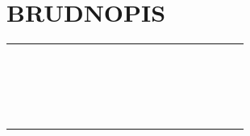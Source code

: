 \documentclass[10pt]{article}
\begin{document}
\section*{BRUDNOPIS}
\begin{center}
\begin{tabular}{|c|c|c|c|c|c|c|c|c|c|c|c|c|c|c|c|c|c|c|c|c|}
\hline
 &  &  &  &  &  &  &  &  &  &  &  &  &  &  &  &  &  &  &  &  \\
\hline
 &  &  &  &  &  &  &  &  &  &  &  &  &  &  &  &  &  &  &  &  \\
\hline
 &  &  &  &  &  &  &  &  &  &  &  &  &  &  &  &  &  &  &  &  \\
\hline
 &  &  &  &  &  &  &  &  &  &  &  &  &  &  &  &  &  &  &  &  \\
\hline
 &  &  &  &  &  &  &  &  &  &  &  &  &  &  &  &  &  &  &  &  \\
\hline
 &  &  &  &  &  &  &  &  &  &  &  &  &  &  &  &  &  &  &  &  \\
\hline
 &  &  &  &  &  &  &  &  &  &  &  &  &  &  &  &  &  &  &  &  \\
\hline
 &  &  &  &  &  &  &  &  &  &  &  &  &  &  &  &  &  &  &  &  \\
\hline
 &  &  &  &  &  &  &  &  &  &  &  &  &  &  &  &  &  &  &  &  \\
\hline
 &  &  &  &  &  &  &  &  &  &  &  &  &  &  &  &  &  &  &  &  \\
\hline
 &  &  &  &  &  &  &  &  &  &  &  &  &  &  &  &  &  &  &  &  \\
\hline
 &  &  &  &  &  &  &  &  &  &  &  &  &  &  &  &  &  &  &  &  \\
\hline
 &  &  &  &  &  &  &  &  &  &  &  &  &  &  &  &  &  &  &  &  \\
\hline
 &  &  &  &  &  &  &  &  &  &  &  &  &  &  &  &  &  &  &  &  \\
\hline
 &  &  &  &  &  &  &  &  &  &  &  &  &  &  &  &  &  &  &  &  \\
\hline
 &  &  &  &  &  &  &  &  &  &  &  &  &  &  &  &  &  &  &  &  \\
\hline
 &  &  &  &  &  &  &  &  &  &  &  &  &  &  &  &  &  &  &  &  \\
\hline
 &  &  &  &  &  &  &  &  &  &  &  &  &  &  &  &  &  &  &  &  \\
\hline
 &  &  &  &  &  &  &  &  &  &  &  &  &  &  &  &  &  &  &  &  \\
\hline
 &  &  &  &  &  &  &  &  &  &  &  &  &  &  &  &  &  &  &  &  \\
\hline
 &  &  &  &  &  &  &  &  &  &  &  &  &  &  &  &  &  &  &  &  \\

\end{tabular}
\end{center}
\end{document}
